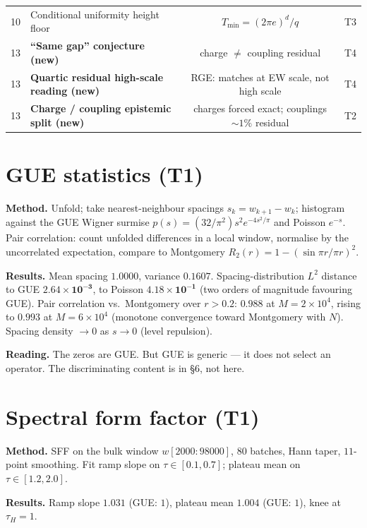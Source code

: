 \documentclass[11pt]{article}
\begin{document}
\begin{center}
\begin{longtable}{clcc}
10 & Conditional uniformity height floor & $T_{\min}=(2\pi e)^d/q$ & T3 \\
13 & \textbf{``Same gap'' conjecture (new)} & charge $\neq$ coupling residual & T4 \\
13 & \textbf{Quartic residual high-scale reading (new)} & RGE: matches at EW scale, not high scale & T4 \\
13 & \textbf{Charge / coupling epistemic split (new)} & charges forced exact; couplings $\sim1\%$ residual & T2 \\
\bottomrule
\end{longtable}
\end{center}

\section{GUE statistics (T1)}

\textbf{Method.} Unfold; take nearest-neighbour spacings $s_k=w_{k+1}-w_k$; histogram against the GUE Wigner surmise $p(s)=(32/\pi^2)s^2e^{-4s^2/\pi}$ and Poisson $e^{-s}$. Pair correlation: count unfolded differences in a local window, normalise by the uncorrelated expectation, compare to Montgomery $R_2(r)=1-(\sin\pi r/\pi r)^2$.

\textbf{Results.} Mean spacing $1.0000$, variance $0.1607$. Spacing-distribution $L^2$ distance to GUE $\mathbf{2.64\times10^{-3}}$, to Poisson $\mathbf{4.18\times10^{-1}}$ (two orders of magnitude favouring GUE). Pair correlation vs.\ Montgomery over $r>0.2$: $\mathbf{0.988}$ at $M{=}2{\times}10^4$, rising to $\mathbf{0.993}$ at $M{=}6{\times}10^4$ (monotone convergence toward Montgomery with $N$). Spacing density $\to0$ as $s\to0$ (level repulsion).

\textbf{Reading.} The zeros are GUE. But GUE is generic --- it does not select an operator. The discriminating content is in \S6, not here.

\section{Spectral form factor (T1)}

\textbf{Method.} SFF on the bulk window $w[2000:98000]$, $80$ batches, Hann taper, $11$-point smoothing. Fit ramp slope on $\tau\in[0.1,0.7]$; plateau mean on $\tau\in[1.2,2.0]$.

\textbf{Results.} Ramp slope $\mathbf{1.031}$ (GUE: $1$), plateau mean $\mathbf{1.004}$ (GUE: $1$), knee at $\tau_H=1$.
\end{document}
